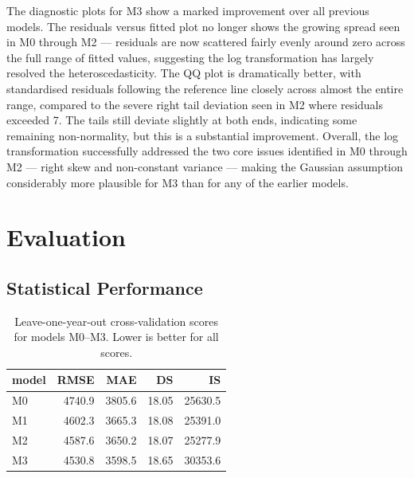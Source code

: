 \documentclass[
]{article}
\begin{document}
The diagnostic plots for M3 show a marked improvement over all previous models. The residuals versus fitted plot no longer shows the growing spread seen in M0 through M2 --- residuals are now scattered fairly evenly around zero across the full range of fitted values, suggesting the log transformation has largely resolved the heteroscedasticity. The QQ plot is dramatically better, with standardised residuals following the reference line closely across almost the entire range, compared to the severe right tail deviation seen in M2 where residuals exceeded 7. The tails still deviate slightly at both ends, indicating some remaining non-normality, but this is a substantial improvement. Overall, the log transformation successfully addressed the two core issues identified in M0 through M2 --- right skew and non-constant variance --- making the Gaussian assumption considerably more plausible for M3 than for any of the earlier models.

\section{Evaluation}\label{evaluation}

\subsection{Statistical Performance}\label{statistical-performance}

\begin{table}[!h]
\centering
\caption{\label{tab:unnamed-chunk-3}Leave-one-year-out cross-validation scores for models M0--M3. Lower is better for all scores.}
\centering
\begin{tabular}[t]{lrrrr}
\toprule
model & RMSE & MAE & DS & IS\\
\midrule
M0 & 4740.9 & 3805.6 & 18.05 & 25630.5\\
M1 & 4602.3 & 3665.3 & 18.08 & 25391.0\\
M2 & 4587.6 & 3650.2 & 18.07 & 25277.9\\
M3 & 4530.8 & 3598.5 & 18.65 & 30353.6\\
\bottomrule
\end{tabular}
\end{table}
\end{document}
